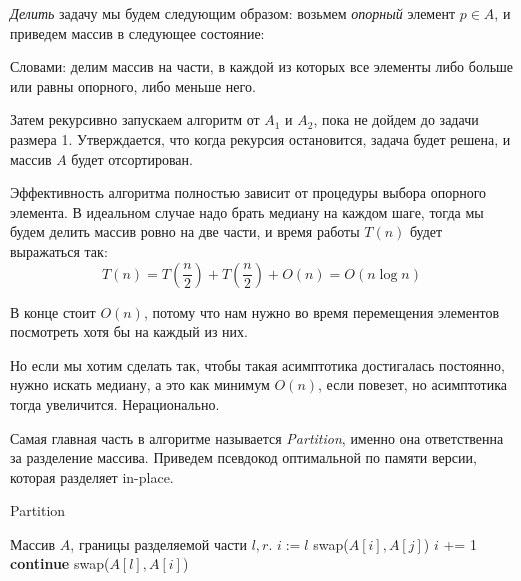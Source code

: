 \documentclass[../book.tex]{subfiles}
\begin{document}
	\textit{Делить} задачу мы будем следующим образом: возьмем \textit{опорный} элемент $p \in A$, и приведем массив в следующее состояние:
	
	\begin{center}
	\end{center}
	
	Словами: делим массив на части, в каждой из которых все элементы либо больше или равны опорного, либо меньше него.
	
	Затем рекурсивно запускаем алгоритм от $A_1$ и $A_2$, пока не дойдем до задачи размера 1. Утверждается, что когда рекурсия остановится, задача будет решена, и массив $A$ будет отсортирован.
	
	Эффективность алгоритма полностью зависит от процедуры выбора опорного элемента. В идеальном случае надо брать медиану на каждом шаге, тогда мы будем делить массив ровно на две части, и время работы $T(n)$ будет выражаться так:
	\[
	T(n) = T\left(\frac{n}{2}\right) + T\left(\frac{n}{2}\right) + O(n) = O(n\log n)
	\]
	
	В конце стоит $O(n)$, потому что нам нужно во время перемещения элементов посмотреть хотя бы на каждый из них. 
	
	Но если мы хотим сделать так, чтобы такая асимптотика достигалась постоянно, нужно искать медиану, а это как минимум $O(n)$, если повезет, но асимптотика тогда увеличится. Нерационально. 
	
	Самая главная часть в алгоритме называется \textit{Partition}, именно она ответственна за разделение массива. Приведем псевдокод оптимальной по памяти версии, которая разделяет in-place. 
	
	\begin{algorithm}[H]
		\caption{Partition}
		\begin{algorithmic}[1]
			\Require Массив $A$, границы разделяемой части $l, r$.
				\State $i := l$
						\State swap($A[i], A[j]$)
						\State $i$ += 1
					\Else
						\State \textbf{continue}
					\EndIf
				\EndFor
				\State swap($A[l], A[i]$)
			\EndFunction
		\end{algorithmic}
	\end{algorithm}
	
\end{document}
